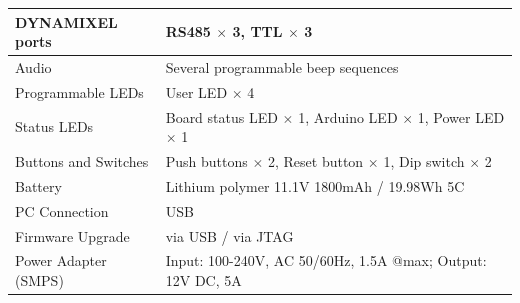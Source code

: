 \begin{table}[htbp]
\begin{tabular}{|l|p{8cm}|}
		\hline
		DYNAMIXEL ports & RS485 $\times$ 3, TTL $\times$ 3 \\
		\hline
		Audio & Several programmable beep sequences \\
		\hline
		Programmable LEDs & User LED $\times$ 4 \\
		\hline
		Status LEDs & Board status LED $\times$ 1, Arduino LED $\times$ 1, Power LED $\times$ 1 \\
		\hline
		Buttons and Switches & Push buttons $\times$ 2, Reset button $\times$ 1, Dip switch $\times$ 2 \\
		\hline
		Battery & Lithium polymer 11.1V 1800mAh / 19.98Wh 5C \\
		\hline
		PC Connection & USB \\
		\hline
		Firmware Upgrade & via USB / via JTAG \\
		\hline
		Power Adapter (SMPS) & Input: 100-240V, AC 50/60Hz, 1.5A @max; Output: 12V DC, 5A \\
		\hline
	\end{tabular}
\end{table}
